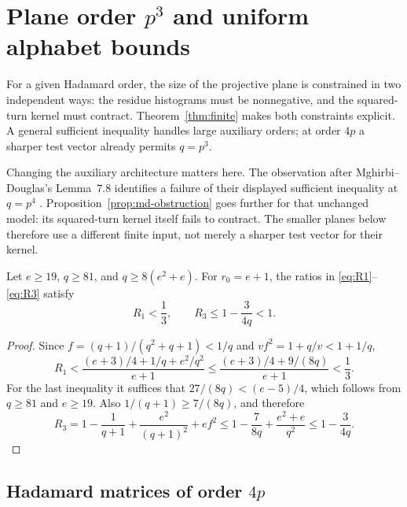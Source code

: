 \section{Plane order \texorpdfstring{$p^3$}{p-cubed} and uniform alphabet bounds}\label{sec:quantitative}
For a given Hadamard order, the size of the projective plane is constrained in two independent ways: the residue histograms must be nonnegative, and the squared-turn kernel must contract. Theorem~\ref{thm:finite} makes both constraints explicit. A general sufficient inequality handles large auxiliary orders; at order $4p$ a sharper test vector already permits $q=p^3$.

Changing the auxiliary architecture matters here. The observation after Mghirbi--Douglas's Lemma~7.8 identifies a failure of their displayed sufficient inequality at $q=p^4$ \cite{MD26}. Proposition~\ref{prop:md-obstruction} goes further for that unchanged model: its squared-turn kernel itself fails to contract. The smaller planes below therefore use a different finite input, not merely a sharper test vector for their kernel.

\enlargethispage{\baselineskip}
\begin{lemma}\label{lem:large-plane}
Let $e\ge19$, $q\ge81$, and $q\ge8(e^2+e)$. For $r_0=e+1$, the ratios in \eqref{eq:R1}--\eqref{eq:R3} satisfy
\[
 R_1<\frac13,\qquad R_3\le1-\frac{3}{4q}<1.
\]
\end{lemma}
\begin{proof}
Since $f=(q+1)/(q^2+q+1)<1/q$ and $vf^2=1+q/v<1+1/q$,
\[
 R_1<\frac{(e+3)/4+1/q+e^2/q^2}{e+1}
 \le\frac{(e+3)/4+9/(8q)}{e+1}<\frac13.
\]
For the last inequality it suffices that $27/(8q)<(e-5)/4$, which follows from $q\ge81$ and $e\ge19$. Also $1/(q+1)\ge7/(8q)$, and therefore
\[
 R_3=1-\frac1{q+1}+\frac{e^2}{(q+1)^2}+ef^2
 \le1-\frac7{8q}+\frac{e^2+e}{q^2}
 \le1-\frac3{4q}.
\]
\end{proof}

\subsection{Hadamard matrices of order $4p$}

